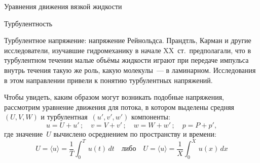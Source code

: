 \begin{chapter}{Уравнения движения вязкой жидкости}
\begin{section}{Турбулентность}
\begin{paragraph}{Турбулентное напряжение: напряжение Рейнольдса.}
%
Прандтль, Карман и другие исследователи, изучавшие гидромеханику в начале
XX~ст.\, предполагали, что в турбулентном течении малые объёмы жидкости 
играют при передаче импульса внутрь течения такую же роль, какую 
молекулы~--- в ламинарном. Исследования в этом направлении привели 
к понятию турбулентных напряжений.
%

Чтобы увидеть, каким образом могут возникать подобные напряжения, рассмотрим
уравнение движения для потока, в котором выделены средняя~$(U, V, W)$ 
и турбулентная~$(u', v', w')$ компоненты:
\begin{equation}\label{eq:8.5}
 u=U+u' \,;\quad v = V+v' \,;\quad w=W+w' \, ;\quad p=P+p',
\end{equation}
где значение~$U$ вычислено осреднением по пространству и времени:
\begin{equation}
U = \langle u \rangle =\frac{1}{T}\int^T_0\,u(t)\,dt \quad \text{либо}\quad
U = \langle u \rangle =\frac{1}{X}\int^X_0\,u(x)\,dx
\end{equation}
%


\end{paragraph}
\end{section}
\end{chapter}
